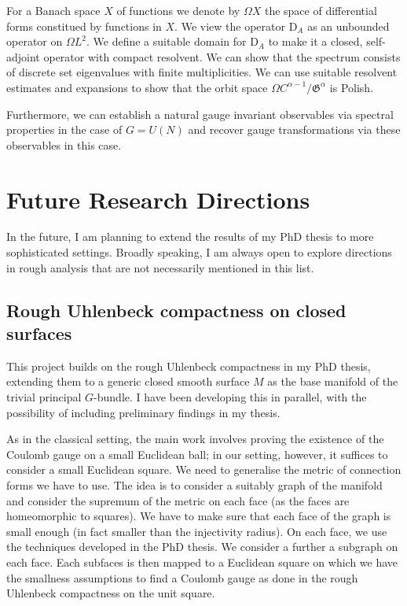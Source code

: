 \documentclass[11pt]{article}
\numberwithin{equation}{section}
\theoremstyle{definition}
\theoremstyle{remark}
\newcommand{\1}{\mathbf 1}
\newcommand{\<}{\langle}
\renewcommand{\>}{\rangle}
\newcommand{\rmD}{\mathrm{D}}
\begin{document}
For a Banach space $X$ of functions we denote by $\Omega X$ the space of differential forms constitued by functions in $X$. We view the operator $\rmD_A$ as an unbounded operator on $\Omega L^2$. We define a suitable domain for $\rmD_A$ to make it a closed, self-adjoint operator with compact resolvent. We can show that the spectrum consists of discrete set eigenvalues with finite multiplicities. We can use suitable resolvent estimates and expansions to show that the orbit space $\Omega C^{\alpha-1}/\mathfrak G^\alpha$ is Polish.

Furthermore, we can establish a natural gauge invariant observables via spectral properties  in the case of $G=U(N)$ and recover gauge transformations via these observables in this case.  



\section{Future Research Directions}\label{sec:future}
In the future, I am planning to extend the results of my PhD thesis to more sophisticated settings. Broadly speaking, I am always open to explore directions in rough analysis that are not necessarily mentioned in this list. 



\subsection{Rough Uhlenbeck compactness on closed surfaces}
%
This project builds on the rough Uhlenbeck compactness in my PhD thesis, extending them to a generic closed smooth surface $M$ as the base manifold of the trivial principal $G$-bundle. I have been developing this in parallel, with the possibility of including preliminary findings in my thesis.
%
%

As in the classical setting, the main work involves proving the existence of the Coulomb gauge on a small Euclidean ball; in our setting, however, it suffices to consider a small Euclidean square. We need to generalise the metric of connection forms we have to use. The idea is to consider a suitably graph of the manifold and consider the supremum of the metric on each face (as the faces are homeomorphic to squares). We have to make sure that each face of the graph is small enough (in fact smaller than the injectivity radius). On each face, we use the techniques developed in the PhD thesis. We consider a further a subgraph on each face. Each subfaces is then mapped to a Euclidean square on which we have the smallness assumptions to find a Coulomb gauge as done in the rough Uhlenbeck compactness on the unit square. 
\end{document}
